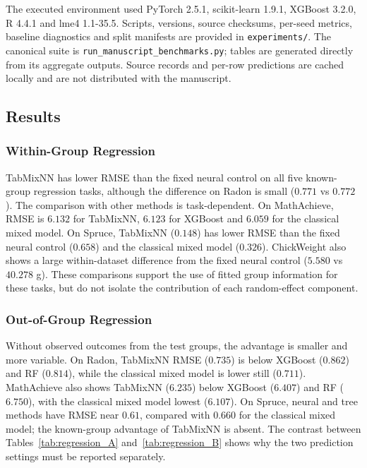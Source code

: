 The executed environment used PyTorch 2.5.1, scikit-learn 1.9.1, XGBoost 3.2.0, R 4.4.1 and lme4 1.1-35.5. Scripts, versions, source checksums, per-seed metrics, baseline diagnostics and split manifests are provided in \texttt{experiments/}. The canonical suite is \texttt{run\_manuscript\_benchmarks.py}; tables are generated directly from its aggregate outputs. Source records and per-row predictions are cached locally and are not distributed with the manuscript.

\subsection{Results}

\subsubsection{Within-Group Regression}
TabMixNN has lower RMSE than the fixed neural control on all five known-group regression tasks, although the difference on Radon is small ($0.771$ vs $0.772$). The comparison with other methods is task-dependent. On MathAchieve, RMSE is $6.132$ for TabMixNN, $6.123$ for XGBoost and $6.059$ for the classical mixed model. On Spruce, TabMixNN ($0.148$) has lower RMSE than the fixed neural control ($0.658$) and the classical mixed model ($0.326$). ChickWeight also shows a large within-dataset difference from the fixed neural control ($5.580$ vs $40.278$ g). These comparisons support the use of fitted group information for these tasks, but do not isolate the contribution of each random-effect component.


\FloatBarrier

\subsubsection{Out-of-Group Regression}
Without observed outcomes from the test groups, the advantage is smaller and more variable. On Radon, TabMixNN RMSE ($0.735$) is below XGBoost ($0.862$) and RF ($0.814$), while the classical mixed model is lower still ($0.711$). MathAchieve also shows TabMixNN ($6.235$) below XGBoost ($6.407$) and RF ($6.750$), with the classical mixed model lowest ($6.107$). On Spruce, neural and tree methods have RMSE near $0.61$, compared with $0.660$ for the classical mixed model; the known-group advantage of TabMixNN is absent. The contrast between Tables~\ref{tab:regression_A} and~\ref{tab:regression_B} shows why the two prediction settings must be reported separately.

